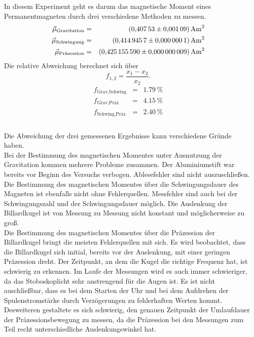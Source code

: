 In diesem Experiment geht es darum das magnetische Moment eines Permanentmagneten durch drei verschiedene Methoden zu messen.
\begin{align*}
  \vec{\mu}_{\text{Gravitation}} &=& \SI{0.40753 \pm 0.00109}{A m^2}\\
  \vec{\mu}_{\text{Schwingung}}  &=& \SI{0.4149457 \pm 0.0000001}{A m^2}\\
  \vec{\mu}_{\text{Präzession}}  &=& \SI{0.42515559 \pm 0.000000009}{A m^2}\\
\end{align*}
Die relative Abweichung berechnet sich über
\begin{equation*}
  f_{1,2}=\frac{x_{1}-x_{2}}{x_{2}}.
\end{equation*}
\begin{align*}
  f_{\text{Grav,Schwing}} &=& \SI{1.79}{\%}\\
  f_{\text{Grav,Präz}}    &=& \SI{4.15}{\%}\\
  f_{\text{Schwing,Präz}} &=& \SI{2.40}{\%}\\
\end{align*}
\\Die Abweichung der drei gemessenen Ergebnisse kann verschiedene Gründe haben.
\\Bei der Bestimmung des magnetischen Momentes unter Ausnutzung der Gravitation kommen mehrere Probleme zusammen.
Der Aluminiumstift war bereits vor Beginn des Versuchs verbogen.
Ablesefehler sind nicht auszuschließen.
\\Die Bestimmung des magnetischen Momentes über die Schwingungsdauer des Magneten ist ebenfalls nicht ohne Fehlerquellen.
Messfehler sind auch bei der Schwingungszahl und der Schwingungsdauer möglich.
Die Auslenkung der Billardkugel ist von Messung zu Messung nicht konstant und möglicherweise zu groß.
\\Die Bestimmung des magnetischen Momentes über die Präzession der Billardkugel bringt die meisten Fehlerquellen mit sich.
Es wird beobachtet, dass die Billardkugel sich initial, bereits vor der Auslenkung, mit einer geringen Präzession dreht.
Der Zeitpunkt, an dem die Kugel die richtige Frequenz hat, ist schwierig zu erkennen.
Im Laufe der Messungen wird es auch immer schwieriger, da das Stoboskoplicht sehr anstrengend für die Augen ist.
Es ist nicht auschließbar, dass es bei dem Starten der Uhr und bei dem Aufdrehen der Spulenstromstärke durch Verzögerungen zu fehlerhaften Werten kommt.
Desweiteren gestaltete es sich schwierig, den genauen Zeitpunkt der Umlaufdauer der Präzessionsbewegung zu messen, da die Präzession bei den Messungen zum Teil recht unterschiedliche Auslenkungswinkel hat.
